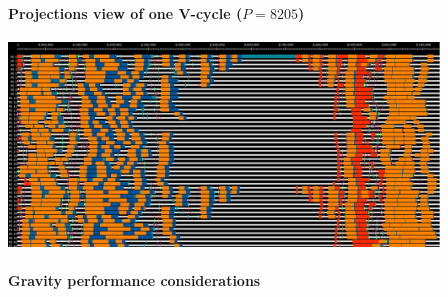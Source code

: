\begin{frame}[fragile,label=ss-recent-gravity] 
\secframetitle{\ssRecentGravity}
\framesubtitle{Projections view of one V-cycle ($P=8205$)}
  \begin{center}
    \vspace{-0.1in}
    \begin{minipage}{4.5in}
          \includegraphics[width=4.5in]{mg0-vcycle-new-2.pdf}
    \end{minipage}
  \end{center}
\end{frame}
% 
%
%
%
%
%        
%
%
\begin{frame}[fragile,label=ss-recent-gravity] 
\secframetitle{\ssRecentGravity}
\framesubtitle{Gravity performance considerations}
\end{frame}
%     
%
